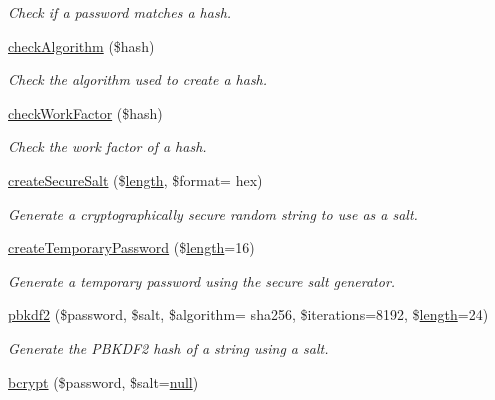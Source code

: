 \begin{DoxyCompactItemize}
\begin{DoxyCompactList}\small\item\em Check if a password matches a hash. \end{DoxyCompactList}\item 
\hyperlink{classPassword_a9bcd6f8ec84385ed4973e4bef05ecbea}{check\+Algorithm} (\$hash)
\begin{DoxyCompactList}\small\item\em Check the algorithm used to create a hash. \end{DoxyCompactList}\item 
\hyperlink{classPassword_aba9bca7cad134de9f4895852523ebec1}{check\+Work\+Factor} (\$hash)
\begin{DoxyCompactList}\small\item\em Check the work factor of a hash. \end{DoxyCompactList}\item 
\hyperlink{classPassword_a76fa768628b67c0f841b2c9acab9d678}{create\+Secure\+Salt} (\$\hyperlink{xpresseditor_8min_8js_a8251a40bc2803d85bf8a918f1f288cce}{length}, \$format= \textquotesingle{}hex\textquotesingle{})
\begin{DoxyCompactList}\small\item\em Generate a cryptographically secure random string to use as a salt. \end{DoxyCompactList}\item 
\hyperlink{classPassword_aef378e672d57dbe203242230c3cc45a9}{create\+Temporary\+Password} (\$\hyperlink{xpresseditor_8min_8js_a8251a40bc2803d85bf8a918f1f288cce}{length}=16)
\begin{DoxyCompactList}\small\item\em Generate a temporary password using the secure salt generator. \end{DoxyCompactList}\item 
\hyperlink{classPassword_ac87ffce0f03ab9b36287a22d1d70162d}{pbkdf2} (\$password, \$salt, \$algorithm= \textquotesingle{}sha256\textquotesingle{}, \$iterations=8192, \$\hyperlink{xpresseditor_8min_8js_a8251a40bc2803d85bf8a918f1f288cce}{length}=24)
\begin{DoxyCompactList}\small\item\em Generate the P\+B\+K\+D\+F2 hash of a string using a salt. \end{DoxyCompactList}\item 
\hyperlink{classPassword_a097e73abceaf4b976c92471f9b4a2cab}{bcrypt} (\$password, \$salt=\hyperlink{modernizr_8min_8js_a286f9ec831c5e676eeb493248eab9575}{null})

\end{DoxyCompactItemize}
